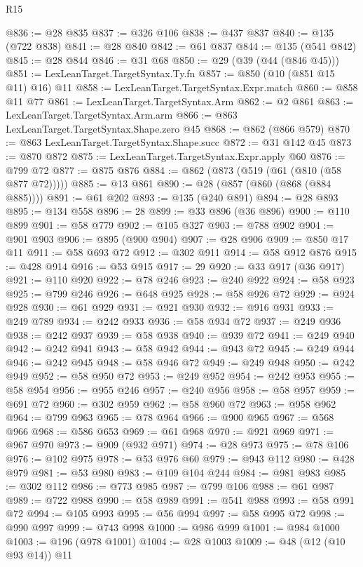 \begin{lexlean}{R15}
\begin{coremodule}
@836 := @28 @835
@837 := @326 @106
@838 := @437 @837
@840 := @135 (@722 @838)
@841 := @28 @840
@842 := @61 @837
@844 := @135 (@541 @842)
@845 := @28 @844
@846 := @31 @68
@850 := @29 (@39 (@44 (@846 @45)))
@851 := LexLeanTarget.TargetSyntax.Ty.fn
@857 := @850 (@10 (@851 @15 @11) @16) @11
@858 := LexLeanTarget.TargetSyntax.Expr.match
@860 := @858 @11 @77
@861 := LexLeanTarget.TargetSyntax.Arm
@862 := @2 @861
@863 := LexLeanTarget.TargetSyntax.Arm.arm
@866 := @863 LexLeanTarget.TargetSyntax.Shape.zero @45
@868 := @862 (@866 @579)
@870 := @863 LexLeanTarget.TargetSyntax.Shape.succ
@872 := @31 @142 @45
@873 := @870 @872
@875 := LexLeanTarget.TargetSyntax.Expr.apply @60
@876 := @799 @72
@877 := @875 @876
@884 := @862 (@873 (@519 (@61 (@810 (@58 @877 @72)))))
@885 := @13 @861
@890 := @28 (@857 (@860 (@868 (@884 @885))))
@891 := @61 @202
@893 := @135 (@240 @891)
@894 := @28 @893
@895 := @134 @558
@896 := 28
@899 := @33 @896 (@36 @896)
@900 := @110 @899
@901 := @58 @779
@902 := @105 @327
@903 := @788 @902
@904 := @901 @903
@906 := @895 (@900 @904)
@907 := @28 @906
@909 := @850 @17 @11
@911 := @58 @693 @72
@912 := @302 @911
@914 := @58 @912 @876
@915 := @428 @914
@916 := @53 @915
@917 := 29
@920 := @33 @917 (@36 @917)
@921 := @110 @920
@922 := @78 @246
@923 := @240 @922
@924 := @58 @923
@925 := @799 @246
@926 := @648 @925
@928 := @58 @926 @72
@929 := @924 @928
@930 := @61 @929
@931 := @921 @930
@932 := @916 @931
@933 := @249 @789
@934 := @242 @933
@936 := @58 @934 @72
@937 := @249 @936
@938 := @242 @937
@939 := @58 @938
@940 := @939 @72
@941 := @249 @940
@942 := @242 @941
@943 := @58 @942
@944 := @943 @72
@945 := @249 @944
@946 := @242 @945
@948 := @58 @946 @72
@949 := @249 @948
@950 := @242 @949
@952 := @58 @950 @72
@953 := @249 @952
@954 := @242 @953
@955 := @58 @954
@956 := @955 @246
@957 := @240 @956
@958 := @58 @957
@959 := @691 @72
@960 := @302 @959
@962 := @58 @960 @72
@963 := @958 @962
@964 := @799 @963
@965 := @78 @964
@966 := @900 @965
@967 := @568 @966
@968 := @586 @653
@969 := @61 @968
@970 := @921 @969
@971 := @967 @970
@973 := @909 (@932 @971)
@974 := @28 @973
@975 := @78 @106
@976 := @102 @975
@978 := @53 @976 @60
@979 := @943 @112
@980 := @428 @979
@981 := @53 @980
@983 := @109 @104 @244
@984 := @981 @983
@985 := @302 @112
@986 := @773 @985
@987 := @799 @106
@988 := @61 @987
@989 := @722 @988
@990 := @58 @989
@991 := @541 @988
@993 := @58 @991 @72
@994 := @105 @993
@995 := @56 @994
@997 := @58 @995 @72
@998 := @990 @997
@999 := @743 @998
@1000 := @986 @999
@1001 := @984 @1000
@1003 := @196 (@978 @1001)
@1004 := @28 @1003
@1009 := @48 (@12 (@10 @93 @14)) @11

\end{coremodule}
\end{lexlean}
